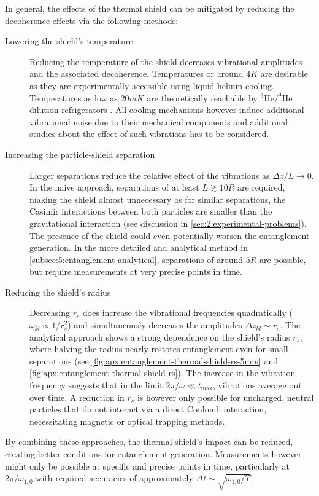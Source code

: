 In general, the effects of the thermal shield can be mitigated by reducing the decoherence effects via the following methods:
\begin{description}
  \item[Lowering the shield's temperature] Reducing the temperature of the shield decreases vibrational amplitudes and the associated decoherence. Temperatures or around $4\si{K}$ are desirable as they are experimentally accessible using liquid helium cooling. Temperatures as low as $20\si{mK}$ are theoretically reachable by $^3\mathrm{He}/^4\mathrm{He}$ dilution refrigerators \cite{Das_1965, Zu_2022}. All cooling mechanisms however induce additional vibrational noise due to their mechanical components and additional studies about the effect of such vibrations has to be considered.

  \item[Increasing the particle-shield separation] Larger separations reduce the relative effect of the vibrations as $\Delta z / L \rightarrow 0$. In the naive approach, separations of at least $L \gtrsim 10 R$ are required, making the shield almost unnecessary as for similar separations, the Casimir interactions between both particles are smaller than the gravitational interaction (see discussion in \cref{sec:2:experimental-problems}). The presence of the shield could even potentially worsen the entanglement generation. In the more detailed and analytical method in \cref{subsec:5:entanglement-analytical}, separations of around $5R$ are possible, but require measurements at very precise points in time.
  
  \item[Reducing the shield's radius] Decreasing $r_s$ does increase the vibrational frequencies quadratically ($\omega_{kl} \propto 1/r_s^2$) and simultaneously decreases the amplitudes $\Delta z_{kl} \sim r_s$. The analytical approach shows a strong dependence on the shield's radius $r_s$, where halving the radius nearly restores entanglement even for small separations (see \cref{fig:apx:entanglement-thermal-shield-rs-5mm} and \cref{fig:apx:entanglement-thermal-shield-rs}). The increase in the vibration frequency suggests that in the limit $2\pi/\omega \ll t_\mathrm{max}$, vibrations average out over time. A reduction in $r_s$ is however only possible for uncharged, neutral particles that do not interact via a direct Coulomb interaction, necessitating magnetic or optical trapping methods.
\end{description}
By combining these approaches, the thermal shield's impact can be reduced, creating better conditions for entanglement generation. Measurements however might only be possible at specific and precise points in time, particularly at $2\pi/\omega_{1,0}$ with required accuracies of approximately $\Delta t \sim \sqrt{\omega_{1,0} / T}$.

